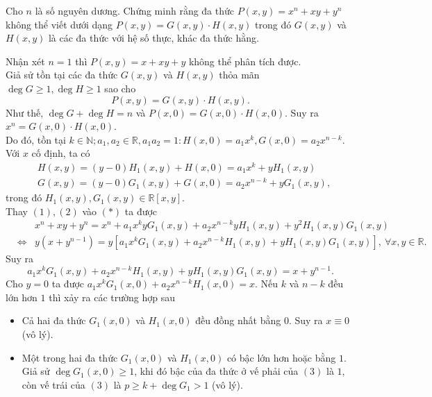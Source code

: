 \begin{bt}[VMO-2011]
Cho $ n $ là số nguyên dương. Chứng minh rằng đa thức $ P(x, y)=x^n+xy+y^n $ không thể viết dưới dạng $ P(x, y)=G(x, y)\cdot H(x, y) $ trong đó $ G(x, y) $ và $ H(x, y) $ là các đa thức với hệ số thực, khác đa thức hằng.
\loigiai
{Nhận xét $ n=1 $ thì $ P(x, y)=x+xy+y $ không thể phân tích được.\\
Giả sử tồn tại các đa thức $ G(x, y) $ và $ H(x, y) $ thỏa mãn $ \deg G\geq 1, \deg H\geq 1 $	sao cho \begin{equation*}
P(x, y)=G(x, y)\cdot H(x, y). \tag{*}
\end{equation*} 
Như thế, $ \deg G +\deg H=n $ và $ P(x, 0)=G(x, 0)\cdot H(x, 0) $. Suy ra $ x^n=G(x, 0)\cdot H(x, 0) $.\\
Do đó, tồn tại $ k\in\mathbb{N}; a_1, a_2\in\mathbb{R}, a_1a_2=1\colon H(x, 0)=a_1x^k, G(x, 0)=a_2x^{n-k} $.\\
Với $ x $ cố định, ta có \begin{align*}
& H(x, y)=(y-0)H_1(x, y)+H(x, 0)=a_1 x^k+yH_1(x, y)\tag{1}\\
& G(x, y)= (y-0)G_1(x, y)+G(x, 0)=a_2x^{n-k}+yG_1(x, y),\tag{2}
\end{align*}
trong đó $ H_1(x, y), G_1(x, y)\in\mathbb{R}[x, y] $.\\
Thay $ (1), (2) $ vào $ (*) $ ta được
\begin{eqnarray*}
&&x^n+xy+y^n=x^n+a_1x^kyG_1(x, y)+a_2x^{n-k}yH_1(x, y)+y^2H_1(x, y)G_1(x, y)\\
&\Leftrightarrow & y\left(x+y^{n-1}\right)=y\left[a_1x^kG_1(x, y)+a_2x^{n-k}H_1(x, y)+yH_1(x, y)G_1(x, y)\right],\ \forall x, y\in\mathbb{R}.
\end{eqnarray*}
Suy ra \begin{equation*}
a_1x^kG_1(x, y)+a_2x^{n-k}H_1(x, y)+yH_1(x, y)G_1(x, y)=x+y^{n-1}.\tag{**}
\end{equation*}
Cho $ y=0 $ ta được $ a_1x^kG_1(x, 0)+a_2x^{n-k}H_1(x, 0)=x$.\noindent
Nếu $ k $ và $ n-k $ đều lớn hơn $ 1 $ thì xảy ra các trường hợp sau
\begin{itemize}
	\item Cả hai đa thức $ G_1(x, 0) $ và $ H_1(x, 0) $ đều đồng nhất bằng $ 0 $. Suy ra $ x\equiv 0 $ (vô lý).
	\item  Một trong hai đa thức $ G_1(x, 0) $ và $ H_1(x, 0) $ có bậc lớn hơn hoặc bằng $ 1 $.\\
	Giả sử $ \deg G_1(x, 0)\geq 1 $, khi đó bậc của  đa thức ở vế phải  của $ (3) $ là $ 1 $, còn vế trái của $ (3) $ là $ p\geq k+\deg G_1>1 $ (vô lý). 

\end{itemize}}
\end{bt}
